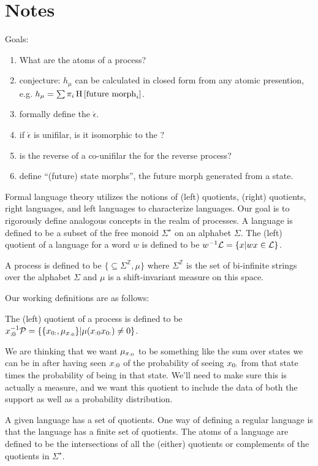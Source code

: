 \documentclass[prl,twocolumn,showpacs,superscriptaddress,preprintnumbers,floatfix]{revtex4-1}
\newcommand{\etomata}{\ensuremath{\acute{\epsilon}}\text{tomata}\xspace}
\begin{document}
\section{Notes}

Goals:
\begin{enumerate}
  \item What are the atoms of a process?
  \item conjecture: $h_\mu$ can be calculated in closed form from any atomic
    presention, e.g. $h_\mu = \sum \pi_i \operatorname{H}\left[\textrm{future morph}_i\right]$.
  \item formally define the \etomata.
  \item if \etomata is unifilar, is it isomorphic to the \eM?
  \item is the reverse of a co-unifilar \eM the \eM for the reverse
    process?
  \item define ``(future) state morphs'', the future morph generated from a
    state.
\end{enumerate}

Formal language theory utilizes the notions of (left) quotients, (right)
quotients, right languages, and left languages to characterize languages. Our
goal is to rigorously define analogous concepts in the realm of processes. A
language \Language is defined to be a subset of the free monoid
$\Sigma^{\star}$ on an alphabet $\Sigma$. The (left) quotient of a language
\Language for a word $w$ is defined to be $w^{-1}\mathcal{L} = \{ x | wx \in
\mathcal{L} \}$.

A process \Process is defined to be $\{\subseteq \Sigma^{\mathbb{Z}}, \mu\}$
where $\Sigma^{\mathbb{Z}}$ is the set of bi-infinite strings over the alphabet
$\Sigma$ and $\mu$ is a shift-invariant measure on this space.

Our working definitions are as follows:

The (left) quotient of a process \Process is defined to be ${x}_{:0}^{-1} \mathcal{P} =
\{ \{ {x}_{0:}, \mu_{{x}_{:0}} \} | \mu({x}_{:0} {x}_{0:}) \neq 0 \}$.

We are thinking that we want $\mu_{{x}_{:0}}$ to be something like the sum over
states we can be in after having seen ${x}_{:0}$ of the probability of seeing
${x}_{0:}$ from that state times the probability of being in that state.
We'll need to make sure this is actually a measure, and we want this quotient to
include the data of both the support as well as a probability distribution.

A given language \Language has a set of quotients.  One way of defining a
regular language is that the language has a finite set of quotients.  The atoms
of a language are defined to be the intersections of all the (either) quotients
or complements of the quotients in $\Sigma^{\star}$.
\end{document}

